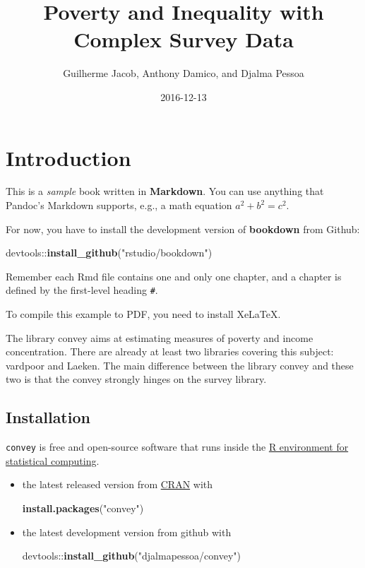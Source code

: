 \documentclass[]{book}
\title{Poverty and Inequality with Complex Survey Data}
\author{Guilherme Jacob, Anthony Damico, and Djalma Pessoa}
\date{2016-12-13}
\newenvironment{Shaded}{\begin{snugshade}}{\end{snugshade}}
\newcommand{\KeywordTok}[1]{\textcolor[rgb]{0.13,0.29,0.53}{\textbf{{#1}}}}
\newcommand{\StringTok}[1]{\textcolor[rgb]{0.31,0.60,0.02}{{#1}}}
\newcommand{\NormalTok}[1]{{#1}}
\begin{document}
\maketitle

{
\setcounter{tocdepth}{1}
\tableofcontents
}
\chapter{Introduction}\label{introduction}

This is a \emph{sample} book written in \textbf{Markdown}. You can use
anything that Pandoc's Markdown supports, e.g., a math equation
\(a^2 + b^2 = c^2\).

For now, you have to install the development version of
\textbf{bookdown} from Github:

\begin{Shaded}
\begin{Highlighting}[]
\NormalTok{devtools::}\KeywordTok{install_github}\NormalTok{(}\StringTok{"rstudio/bookdown"}\NormalTok{)}
\end{Highlighting}
\end{Shaded}

Remember each Rmd file contains one and only one chapter, and a chapter
is defined by the first-level heading \texttt{\#}.

To compile this example to PDF, you need to install XeLaTeX.

The library convey aims at estimating measures of poverty and income
concentration. There are already at least two libraries covering this
subject: vardpoor and Laeken. The main difference between the library
convey and these two is that the convey strongly hinges on the survey
library.

\section{Installation}\label{install}

\texttt{convey} is free and open-source software that runs inside the
\href{https://www.r-project.org/}{R environment for statistical
computing}.

\begin{itemize}
\item
  the latest released version from
  \href{https://CRAN.R-project.org/package=convey}{CRAN} with

\begin{Shaded}
\begin{Highlighting}[]
\KeywordTok{install.packages}\NormalTok{(}\StringTok{"convey"}\NormalTok{)}
\end{Highlighting}
\end{Shaded}
\item
  the latest development version from github with

\begin{Shaded}
\begin{Highlighting}[]
\NormalTok{devtools::}\KeywordTok{install_github}\NormalTok{(}\StringTok{"djalmapessoa/convey"}\NormalTok{)}
\end{Highlighting}
\end{Shaded}
\end{itemize}
\end{document}
